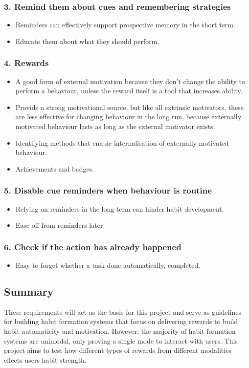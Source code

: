 \subsubsection*{3. Remind them about cues and remembering strategies}
  \begin{itemize}
    \item Reminders can effectively support prospective memory in the short term.
    \item Educate them about what they should perform.
  \end{itemize}

\subsubsection*{4. Rewards}
  \begin{itemize}
    \item A good form of external motivation because they don't change the ability to perform a behaviour, unless the reward itself is a tool that increases ability.
    \item Provide a strong motivational source, but like all extrinsic motivators, these are less effective for changing behaviour in the long run, because externally motivated behaviour lasts as long as the external motivator exists.
    \item Identifying methods that enable internalisation of externally motivated behaviour.
    \item Achievements and badges.
  \end{itemize}

\subsubsection*{5. Disable cue reminders when behaviour is routine}
  \begin{itemize}
    \item Relying on reminders in the long term can hinder habit development.
    \item Ease off from reminders later.
  \end{itemize}

\subsubsection*{6. Check if the action has already happened}
  \begin{itemize}
    \item Easy to forget whether a task done automatically, completed.
  \end{itemize}


\subsection*{Summary}

These requirements will act as the basis for this project and serve as guidelines for building habit formation systems that focus on delivering rewards to build habit automaticity and motivation. However, the majority of habit formation systems are unimodal, only proving a single mode to interact with users. This project aims to test how different types of rewards from different modalities effects users habit strength.
